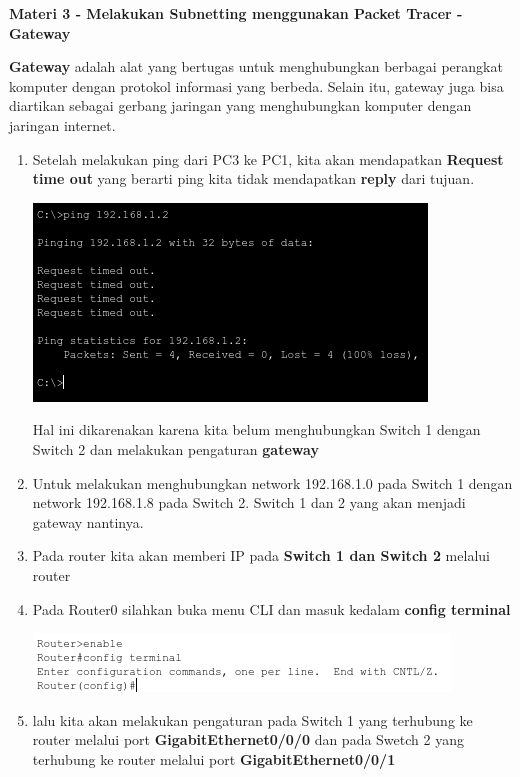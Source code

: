 \documentclass{article}
\begin{document}
    \begin{flushleft}
        \textbf{Materi 3 - Melakukan Subnetting menggunakan Packet Tracer - Gateway}
        \newline

        \textbf{Gateway} adalah alat yang bertugas untuk menghubungkan berbagai perangkat komputer dengan protokol informasi yang berbeda.
        Selain itu, gateway juga bisa diartikan sebagai gerbang jaringan yang menghubungkan komputer dengan jaringan internet.

        \begin{enumerate}
            \item Setelah melakukan ping dari PC3 ke PC1, kita akan mendapatkan \textbf{Request time out} yang berarti ping kita tidak mendapatkan \textbf{reply} dari tujuan.
            
            \includegraphics{3-ping-31.png}

            Hal ini dikarenakan karena kita belum menghubungkan Switch 1 dengan Switch 2 dan melakukan pengaturan \textbf{gateway}

            \item Untuk melakukan menghubungkan network 192.168.1.0 pada Switch 1 dengan network 192.168.1.8 pada Switch 2. Switch 1 dan 2 yang akan menjadi gateway nantinya.
            
            \item Pada router kita akan memberi IP pada \textbf{Switch 1 dan Switch 2} melalui router
            \item Pada Router0 silahkan buka menu CLI dan masuk kedalam \textbf{config terminal}
            
            \includegraphics{3-gt-sw1-en.png}

            \item lalu kita akan melakukan pengaturan pada Switch 1 yang terhubung ke router melalui port \textbf{GigabitEthernet0/0/0} dan pada Swetch 2 yang terhubung ke router melalui port \textbf{GigabitEthernet0/0/1}
            

\end{enumerate}
\end{flushleft}
\end{document}
